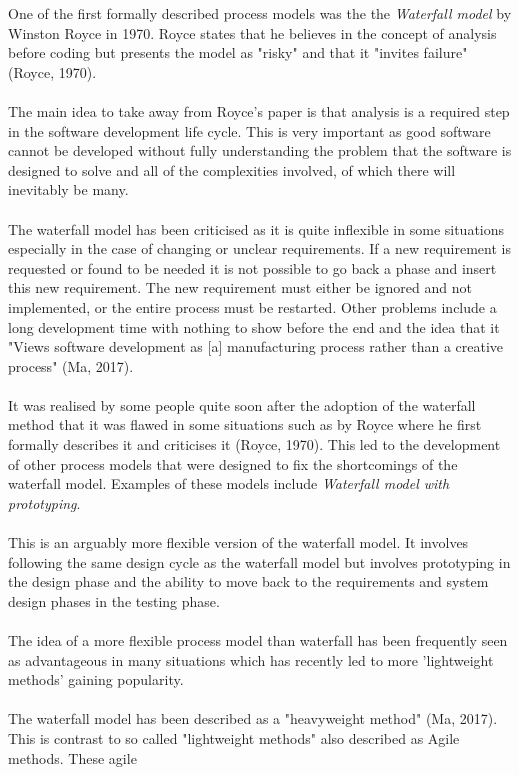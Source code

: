 \documentclass{CRPITStyle}
\begin{document}
		One of the first formally described process models was the the \textit{Waterfall model} by Winston Royce in 1970.
		Royce states that he believes in the concept of analysis before coding but presents the model as "risky" and that it
		"invites failure" (Royce, 1970).\\
		~\\
		The main idea to take away from Royce's paper is that analysis is a required step in the software development life cycle.
		This is very important as good software cannot be developed without fully understanding the problem that the software
		is designed to solve and all of the complexities involved, of which there will inevitably be many.\\
		~\\
		The waterfall model has been criticised as it is quite inflexible in some situations especially in the case of changing
		or unclear requirements. If a new requirement is requested or found to be needed it is not possible to go back a phase
		and insert this new requirement. The new requirement must either be ignored and not implemented, or the entire
		process must be restarted. Other problems include a long development time with nothing to show before the end and
		the idea that it "Views software development as [a] manufacturing process rather than a creative process" (Ma, 2017).\\
		~\\
		It was realised by some people quite soon after the adoption of the waterfall method that it was flawed in some 
		situations such as by Royce where he first formally describes it and criticises it (Royce, 1970). This led to the
		development of other process models that were designed to fix the shortcomings of the waterfall model. Examples of
		these models include \textit{Waterfall model with prototyping}. \\
		~\\
		 This is an arguably more flexible version of the waterfall model. It involves following the same
		 design cycle as the waterfall model but involves prototyping in the design phase
		and the ability to move back to the requirements and system design phases in the testing phase.\\
		~\\
		The idea of a more flexible process model than waterfall has been frequently seen as advantageous in many situations
		which has recently led to more 'lightweight methods' gaining popularity.\\
		~\\
		The waterfall model has been described as a "heavyweight method" (Ma, 2017). This is contrast to so called
		 "lightweight methods" also described as Agile methods. These agile
		
\end{document}
